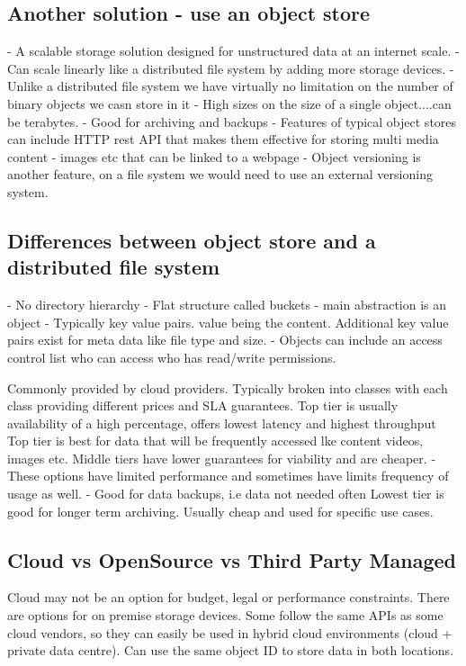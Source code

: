 \documentclass[a4paper, 11pt]{book}
\begin{document}
    \subsection{Another solution - use an object store}
    - A scalable storage solution designed for unstructured data at an internet scale.
    - Can scale linearly like a distributed file system by adding more storage devices.
    - Unlike a distributed file system we have virtually no limitation on the number of binary objects we casn store in it
    - High sizes on the size of a single object....can be terabytes.
    - Good for archiving and backups
    - Features of typical object stores can include HTTP rest API that makes them effective for storing multi media content - images etc that can be linked to a webpage
    - Object versioning is another feature, on a file system we would need to use an external versioning system.

    \subsection{Differences between object store and a distributed file system}
    - No directory hierarchy
    - Flat structure called buckets
    - main abstraction is an object
    - Typically key value pairs. value being the content. Additional key value pairs exist for meta data like file type and size.
    - Objects can include an access control list who can access who has read/write permissions.

    Commonly provided by cloud providers.
    Typically broken into classes with each class providing different prices and SLA guarantees.
    Top tier is usually availability of a high percentage, offers lowest latency and highest throughput
    Top tier is best for data that will be frequently accessed lke content videos, images etc.
    Middle tiers have lower guarantees for viability and are cheaper.
    - These options have limited performance and sometimes have limits frequency of usage as well.
    - Good for data backups, i.e data not needed often
    Lowest tier is good for longer term archiving.
    Usually cheap and used for specific use cases.

    \subsection{Cloud vs OpenSource vs Third Party Managed}
    Cloud may not be an option for budget, legal or performance constraints.
    There are options for on premise storage devices.
    Some follow the same APIs as some cloud vendors, so they can easily be used in hybrid cloud environments (cloud + private data centre).
    Can use the same object ID to store data in both locations.
\end{document}
